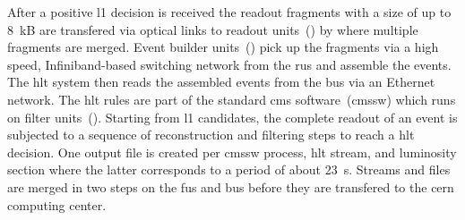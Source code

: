 After a positive \gls{l1} decision is received the readout fragments with a size of up to 8~kB are transfered via optical links to readout units~() by  where multiple fragments are merged. Event builder units~() pick up the fragments via a high speed, Infiniband-based switching network from the \glspl{ru} and assemble the events.
The \gls{hlt} system then reads the assembled events from the \glspl{bu} via an Ethernet network. The \gls{hlt} rules are part of the standard \gls{cms} software~(\gls{cmssw}) which runs on filter units~(). Starting from \gls{l1} candidates, the complete readout of an event is subjected to a sequence of reconstruction and filtering steps to reach a \gls{hlt} decision. One output file is created per \gls{cmssw} process, \gls{hlt} stream, and luminosity section where the latter corresponds to a period of about 23~s. Streams and files are merged in two steps on the \glspl{fu} and \glspl{bu} before they are transfered to the \gls{cern} computing center.
